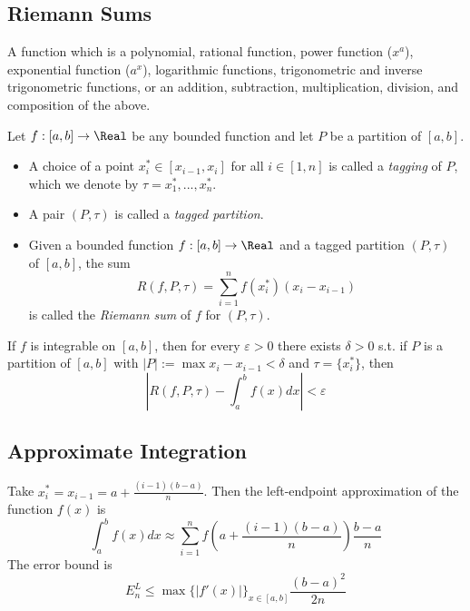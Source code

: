 \subsection*{Riemann Sums}

\begin{definition}
  A function which is a polynomial, rational function, power function ($x^a$), exponential function ($a^x$), logarithmic functions, trigonometric and inverse trigonometric functions, or an addition, subtraction, multiplication, division, and composition of the above.
\end{definition} 

\begin{definition}
  Let $f : [a, b] \to \Real$ be any bounded function and let $P$ be a partition of $[a, b]$.
  \begin{itemize}
    \item A choice of a point ${x_i^*} \in [x_{i-1}, x_{i}]$ for all $i \in [1, n]$ is called a \textit{tagging} of $P$, which we denote by $\tau = {x_1^*, ..., x_n^*}$.
    \item A pair $(P, \tau)$ is called a \textit{tagged partition}.
    \item Given a bounded function $f : [a, b] \to \Real$ and a tagged partition $(P, \tau)$ of $[a, b]$, the sum 
    \[
      R(f, P, \tau) = \sum_{i=1}^{n} f(x_i^*)(x_i - x_{i-1})
    \]
    is called the \textit{Riemann sum} of $f$ for $(P, \tau)$.
  \end{itemize}
\end{definition}

\begin{theorem}
  If $f$ is integrable on $[a, b]$, then for every $\varepsilon > 0$ there exists $\delta > 0$ s.t. if $P$ is a partition of $[a, b]$ with $|P| := \max{x_i - x_{i-1}} < \delta$ and $\tau = \{x_i^*\}$, then 
  \[
    | R(f, P, \tau) - \int_a^b f(x) dx | < \varepsilon
  \] 
\end{theorem}

\subsection*{Approximate Integration}

\begin{definition}
  Take $x_i^* = x_{i-1} = a + \frac{(i-1)(b-a)}{n}$. Then the left-endpoint approximation of the function $f(x)$ is
  \[
    \int_a^b f(x) dx \approx \sum_{i=1}^n f\left(a + \frac{(i-1)(b-a)}{n}\right) \frac{b-a}{n}
  \]
  The error bound is
  \[
    E_n^L \leq \max\{|f'(x)|\}_{x \in [a, b]} \frac{(b-a)^2}{2n}
  \]
\end{definition}

